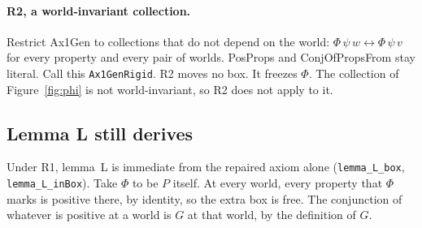 \documentclass[11pt,a4paper]{article}
\newcommand{\lean}[1]{\texttt{#1}}
\theoremstyle{definition}
\theoremstyle{remark}
\begin{document}
\paragraph{R2, a world-invariant collection.}
Restrict Ax1Gen to collections that do not depend on the world:
\(\Phi\,\psi\,w \leftrightarrow \Phi\,\psi\,v\) for every property and every pair of
worlds.
PosProps and ConjOfPropsFrom stay literal.
Call this \lean{Ax1GenRigid}.
R2 moves no box.
It freezes \(\Phi\).
The collection of Figure~\ref{fig:phi} is not world-invariant, so R2 does not
apply to it.

\subsection{Lemma L still derives}

Under R1, lemma~L is immediate from the repaired axiom alone
(\lean{lemma\_L\_box}, \lean{lemma\_L\_inBox}).
Take \(\Phi\) to be \(P\) itself.
At every world, every property that \(\Phi\) marks is positive there, by
identity, so the extra box is free.
The conjunction of whatever is positive at a world is \(G\) at that world, by
the definition of \(G\).
\end{document}
